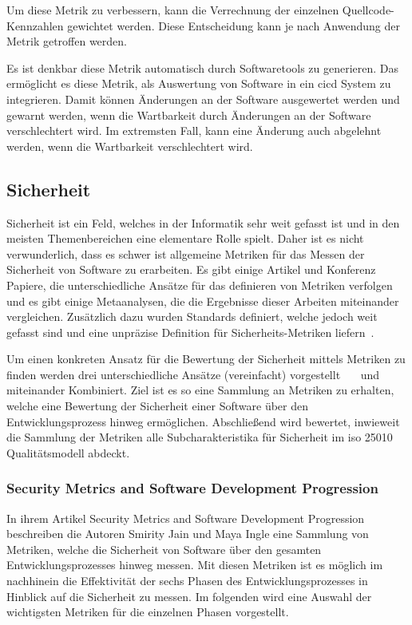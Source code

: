 \documentclass[12pt, a4paper, ngerman]{article}
\begin{document}
Um diese Metrik zu verbessern,
kann die Verrechnung der einzelnen Quellcode-Kennzahlen
gewichtet werden.
Diese Entscheidung kann je nach Anwendung der Metrik getroffen werden.

Es ist denkbar diese Metrik automatisch durch
Softwaretools zu generieren.
Das ermöglicht es diese Metrik, als Auswertung von Software
in ein \ac{cicd} System zu integrieren.
Damit können Änderungen an der Software ausgewertet werden
und gewarnt werden, wenn die Wartbarkeit durch Änderungen an der Software verschlechtert wird.
Im extremsten Fall, kann eine Änderung auch abgelehnt werden, wenn die Wartbarkeit verschlechtert wird.

\subsection{Sicherheit}

Sicherheit ist ein Feld, welches in der Informatik sehr weit gefasst ist und in den meisten Themenbereichen eine elementare Rolle spielt.
Daher ist es nicht verwunderlich, dass es schwer ist allgemeine Metriken für das Messen der Sicherheit von Software zu erarbeiten.
Es gibt einige Artikel und Konferenz Papiere, die unterschiedliche Ansätze für das definieren von Metriken verfolgen und es gibt einige 
Metaanalysen, die die Ergebnisse dieser Arbeiten miteinander vergleichen. 
Zusätzlich dazu wurden Standards definiert, welche jedoch weit gefasst sind und eine unpräzise Definition für Sicherheits-Metriken liefern~\cite{MeFlado_Fernández-Medina_Piattini_2010}.

Um einen konkreten Ansatz für die Bewertung der Sicherheit mittels Metriken zu finden werden 
drei unterschiedliche Ansätze (vereinfacht) vorgestellt~\cite{Jain2014SecurityMA}~\cite{Chowdhury_Chan_Zulkernine_2008}~\cite{Wang_Wang_Guo_Xia_2009} und miteinander Kombiniert.
Ziel ist es so eine Sammlung an Metriken zu erhalten, 
welche eine Bewertung der Sicherheit einer Software über den Entwicklungsprozess hinweg ermöglichen. 
Abschließend wird bewertet, inwieweit die Sammlung der Metriken alle Subcharakteristika für Sicherheit im \ac{iso} 25010 Qualitätsmodell abdeckt.

\subsubsection{Security Metrics and Software Development Progression~\cite{Jain2014SecurityMA}}

In ihrem Artikel Security Metrics and Software Development Progression beschreiben die Autoren Smirity Jain und Maya Ingle eine Sammlung von Metriken, 
welche die Sicherheit von Software über den gesamten Entwicklungsprozesses hinweg messen.
Mit diesen Metriken ist es möglich im nachhinein die Effektivität der sechs Phasen des Entwicklungsprozesses in Hinblick auf die Sicherheit zu messen.
Im folgenden wird eine Auswahl der wichtigsten Metriken für die einzelnen Phasen vorgestellt.
\end{document}

